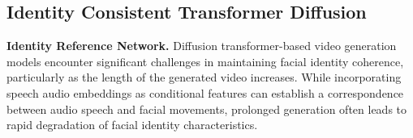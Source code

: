 \subsection{Identity Consistent Transformer Diffusion}\label{sec:identity}





\noindent\textbf{Identity Reference Network.}  
Diffusion transformer-based video generation models encounter significant challenges in maintaining facial identity coherence, particularly as the length of the generated video increases. 
While incorporating speech audio embeddings as conditional features can establish a correspondence between audio speech and facial movements, prolonged generation often leads to rapid degradation of facial identity characteristics.  

